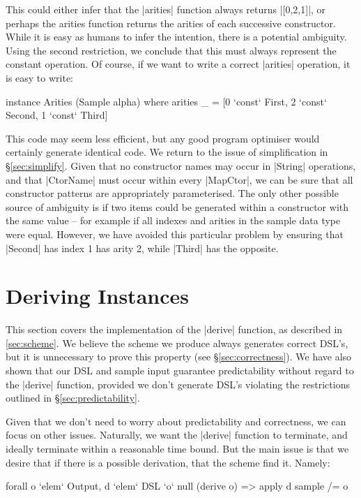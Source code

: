 \documentclass[preprint]{sigplanconf}
\begin{document}
This could either infer that the |arities| function always returns |[0,2,1]|, or perhaps the arities function returns the arities of each successive constructor. While it is easy as humans to infer the intention, there is a potential ambiguity. Using the second restriction, we conclude that this must always represent the constant operation. Of course, if we want to write a correct |arities| operation, it is easy to write:

\begin{code}
instance Arities (Sample alpha) where
    arities _ = [0 `const` First{}, 2 `const` Second{}, 1 `const` Third{}]
\end{code}

This code may seem less efficient, but any good program optimiser would certainly generate identical code. We return to the issue of simplification in \S\ref{sec:simplify}. Given that no constructor names may occur in |String| operations, and that |CtorName| must occur within every |MapCtor|, we can be sure that all constructor patterns are appropriately parameterised. The only other possible source of ambiguity is if two items could be generated within a constructor with the same value -- for example if all indexes and arities in the sample data type were equal. However, we have avoided this particular problem by ensuring that |Second| has index 1 has arity 2, while |Third| has the opposite.

\section{Deriving Instances}
\label{sec:guess}

This section covers the implementation of the |derive| function, as described in \ref{sec:scheme}. We believe the scheme we produce always generates correct DSL's, but it is unnecessary to prove this property (see \S\ref{sec:correctness}). We have also shown that our DSL and sample input guarantee predictability without regard to the |derive| function, provided we don't generate DSL's violating the restrictions outlined in \S\ref{sec:predictability}.

Given that we don't need to worry about predictability and correctness, we can focus on other issues. Naturally, we want the |derive| function to terminate, and ideally terminate within a reasonable time bound. But the main issue is that we desire that if there is a possible derivation, that the scheme find it. Namely:

\begin{code}
forall o `elem` Output, d `elem` DSL `o` null (derive o) => apply d sample /= o
\end{code}
\end{document}
